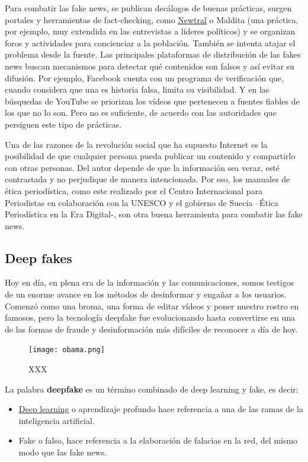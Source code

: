 Para combatir las fake news, se publican decálogos de buenas prácticas, surgen portales y herramientas de fact-checking, como \href{https://www.newtral.es}{Newtral} o Maldita (una práctica, por ejemplo, muy extendida en las entrevistas a líderes políticos) y se organizan foros y actividades para concienciar a la población. También se intenta atajar el problema desde la fuente. Las principales plataformas de distribución de las fakes news buscan mecanismos para detectar qué contenidos son falsos y así evitar su difusión. Por ejemplo, Facebook cuenta con un programa de verificación que, cuando considera que una es historia falsa, limita su visibilidad. Y en las búsquedas de YouTube se priorizan los vídeos que pertenecen a fuentes fiables de los que no lo son. Pero no es suficiente, de acuerdo con las autoridades que persiguen este tipo de prácticas.

Una de las razones de la revolución social que ha supuesto Internet es la posibilidad de que cualquier persona pueda publicar un contenido y compartirlo con otras personas. Del autor depende de que la información sea veraz, esté contrastada y no perjudique de manera intencionada. Por eso, los manuales de ética periodística, como este realizado por el Centro Internacional para Periodistas en colaboración con la UNESCO y el gobierno de Suecia –Ética Periodística en la Era Digital-, son otra buena herramienta para combatir las fake news.

\subsection{Deep fakes}

Hoy en día, en plena era de la información y las comunicaciones, somos testigos de un enorme avance en los métodos de desinformar y engañar a los usuarios. Comenzó como una broma, una forma de editar vídeos y poner nuestro rostro en famosos, pero la tecnología deepfake fue evolucionando hasta convertirse en una de las formas de fraude y desinformación más difíciles de reconocer a día de hoy.

\begin{figure}[ht!]
    \texttt{[image: obama.png]}
    \caption{XXX}
    \label{obama}
\end{figure}

La palabra \textbf{deepfake} es un término combinado de deep learning y fake, es decir:
\begin{itemize}
    \item \href{https://www.xataka.com/robotica-e-ia/deep-learning-que-es-y-por-que-va-a-ser-una-tecnologia-clave-en-el-futuro-de-la-inteligencia-artificial}{Deep learning} o aprendizaje profundo hace referencia a una de las ramas de la inteligencia artificial.
    \item Fake o falso, hace referencia a la elaboración de falacias en la red, del mismo modo que las fake news.
\end{itemize}

